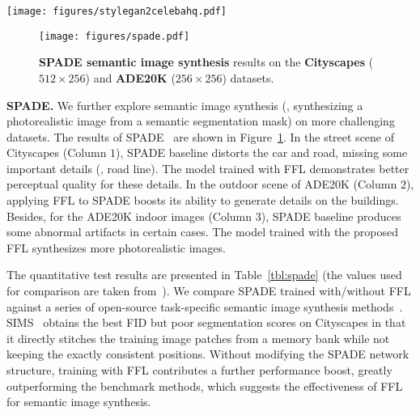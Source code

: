 \documentclass[10pt,twocolumn,letterpaper]{article}
\begin{document}
\begin{figure*}[t]
	\centering
	\vspace{-0.2cm}
	\texttt{[image: figures/stylegan2celebahq.pdf]}
	\vspace{-0.05cm}
	\caption{\textbf{StyleGAN2 unconditional image synthesis} results (without truncation) and the mini-batch average spectra (adjusted to better contrast) on the \textbf{CelebA-HQ} ($256 \times 256$) dataset.}
	\label{fig:stylegan2celebahq}
	\vspace{-0.4cm}
\end{figure*}


\begin{figure}[t]
	\centering
	\vspace{-0.1cm}
	\texttt{[image: figures/spade.pdf]}
\caption{\textbf{SPADE semantic image synthesis} results on the \textbf{Cityscapes} ($512 \times 256$) and \textbf{ADE20K} ($256 \times 256$) datasets.}
	\label{fig:spade}
	\vspace{-0.46cm}
\end{figure}



\vspace{0.05cm}
\noindent
\textbf{SPADE.}
We further explore semantic image synthesis (\ie, synthesizing a photorealistic image from a semantic segmentation mask) on more challenging datasets.
The results of SPADE~\cite{SPADE} are shown in Figure~\ref{fig:spade}.
In the street scene of Cityscapes (Column $1$), SPADE baseline distorts the car and road, missing some important details (\eg, road line).
The model trained with FFL demonstrates better perceptual quality for these details.
In the outdoor scene of ADE20K (Column $2$), applying FFL to SPADE boosts its ability to generate details on the buildings.
Besides, for the ADE20K indoor images (Column $3$), SPADE baseline produces some abnormal artifacts in certain cases. The model trained with the proposed FFL synthesizes more photorealistic images.

The quantitative test results are presented in Table~\ref{tbl:spade} (the values used for comparison are taken from~\cite{SPADE}).
We compare SPADE trained with/without FFL against a series of open-source task-specific semantic image synthesis methods~\cite{CRN,SIMS,pix2pixhd}.
SIMS~\cite{SIMS} obtains the best FID but poor segmentation scores on Cityscapes in that it directly stitches the training image patches from a memory bank while not keeping the exactly consistent positions.
Without modifying the SPADE network structure, training with FFL contributes a further performance boost, greatly outperforming the benchmark methods, which suggests the effectiveness of FFL for semantic image synthesis.
\end{document}
